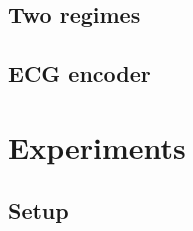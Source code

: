 \documentclass[10pt,twocolumn]{article}
\begin{document}
\subsection{Two regimes}

\subsection{ECG encoder}

\section{Experiments}
\subsection{Setup}

\begin{table}[t]\centering\small
\caption{TabICL, synthetic-prior continued pre-training only. No model has seen any
evaluation dataset. Mean $\pm$ sd over 5 seeds; lower is better.}
\label{tab:1a}
\resizebox{\textwidth}{!}{}
\end{table}
\end{document}
